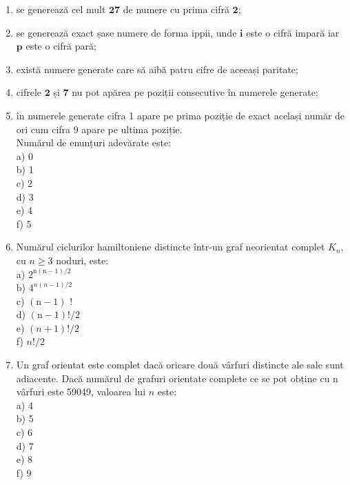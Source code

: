 \begin{enumerate}
  \item se generează cel mult $\mathbf{2 7}$ de numere cu prima cifră $\mathbf{2}$;
  \item se generează exact șase numere de forma ippii, unde $\boldsymbol{i}$ este o cifră impară iar $\boldsymbol{p}$ este o cifră pară;
  \item există numere generate care să aibă patru cifre de aceeași paritate;
  \item cifrele $\mathbf{2}$ și $\mathbf{7}$ nu pot apărea pe poziții consecutive în numerele generate;
  \item în numerele generate cifra 1 apare pe prima poziție de exact același număr de ori cum cifra 9 apare pe ultima poziție.\\
Numărul de enunțuri adevărate este:\\
a) 0\\
b) 1\\
c) 2\\
d) 3\\
e) 4\\
f) 5
  \item Numărul ciclurilor hamiltoniene distincte într-un graf neorientat complet $K_{n}$, cu $n \geq 3$ noduri, este:\\
a) $2^{\mathrm{n}(\mathrm{n}-1) / 2}$\\
b) $4^{n(n-1) / 2}$\\
c) $(\mathrm{n}-1)$ !\\
d) $(\mathrm{n}-1)!/ 2$\\
e) $(n+1)!/ 2$\\
f) $n!/ 2$
  \item Un graf orientat este complet dacă oricare două vârfuri distincte ale sale sunt adiacente. Dacă numărul de grafuri orientate complete ce se pot obține cu n vârfuri este 59049, valoarea lui $n$ este:\\
a) 4\\
b) 5\\
c) 6\\
d) 7\\
e) 8\\
f) 9
\end{enumerate}

